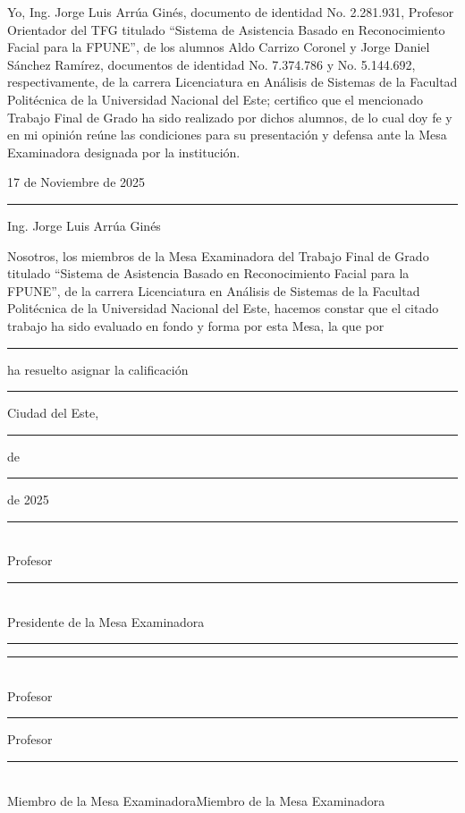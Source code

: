 \thispagestyle{empty}

Yo, Ing. Jorge Luis Arrúa Ginés, documento de identidad No. 2.281.931, Profesor Orientador del TFG titulado “Sistema de Asistencia Basado en Reconocimiento Facial para la FPUNE”, de los alumnos Aldo Carrizo Coronel y Jorge Daniel Sánchez Ramírez, documentos de identidad No. 7.374.786 y No. 5.144.692, respectivamente, de la carrera Licenciatura en Análisis de Sistemas de la Facultad Politécnica de la Universidad Nacional del Este; 
certifico que el mencionado Trabajo Final de Grado ha sido realizado por dichos alumnos, de lo cual doy fe y en mi opinión reúne las condiciones para su presentación y defensa ante la Mesa Examinadora designada por la institución.
\begin{flushright}17 de Noviembre de 2025\end{flushright}
\vspace{0.7cm}
	
\hspace{7cm}\rule{6cm}{0.4pt}
\begin{flushright}
Ing. Jorge Luis Arrúa Ginés
\end{flushright}
		
\vspace{1.6cm}
Nosotros, los miembros de la Mesa Examinadora del Trabajo Final de Grado titulado “Sistema de Asistencia Basado en Reconocimiento Facial para la FPUNE”, de la carrera Licenciatura en Análisis de Sistemas de la Facultad Politécnica de la Universidad Nacional del Este, hacemos constar que el citado trabajo ha sido evaluado en fondo y forma por esta Mesa, la que por \rule{4cm}{0.4pt} ha resuelto asignar la calificación \rule{2cm}{0.4pt}

\begin{flushright}Ciudad del Este, \rule{1cm}{0.4pt} de \rule{2cm}{0.4pt} de 2025 \end{flushright}

\vspace{.5cm}
\hspace{2.2cm}\rule{7cm}{0.4pt}\\
\hspace*{3cm} Profesor \rule{4.5cm}{0.4pt}\\
\hspace*{2.8cm} Presidente de la Mesa Examinadora
\vspace{.7cm}

\hspace*{-0.4cm}\rule{6cm}{0.4pt}\hspace{1.15cm}\rule{6cm}{0.4pt}\\
\vspace{.3cm}
Profesor \rule{4.5cm}{0.4pt}		\hspace{.9cm}Profesor \rule{4.5cm}{0.4pt}\\
Miembro de la Mesa Examinadora\hspace{1cm}Miembro de la Mesa Examinadora
